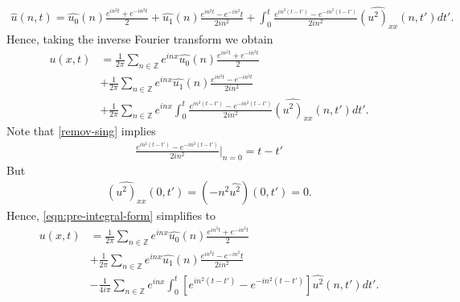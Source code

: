 \documentclass[12pt,reqno]{amsart}
\numberwithin{equation}{section}  %
\numberwithin{figure}{section}
\newcommand{\zz}{\mathbb{Z}}
\newcommand{\wh}{\widehat}
\theoremstyle{plain}
\theoremstyle{definition}
\theoremstyle{remark}
\begin{document}
%
%
\begin{equation*}
\begin{split}
\wh{u}(n, t) = \wh{u_{0}}(n) \frac{e^{in^{2}t} + e^{-in^{2}t}}{2} +
  \wh{u_{1}}(n)\frac{e^{in^{2}t} - e^{-in^{2}}t}{2 i n^{2}} +
  \int_{0}^{t}\frac{e^{in^{2}(t-t')}-e^{-in^{2}(t-t')}}{2in^{2}}
  \wh{(u^{2})_{xx}}(n, t') dt'.
\end{split}
\end{equation*}
%
Hence, taking the inverse Fourier transform we obtain
%
\begin{equation}
  \begin{split}
    u(x,t)
    & = \frac{1}{2\pi}\sum_{n \in \zz} e^{inx} \wh{u_{0}}(n) \frac{e^{in^{2}t} + e^{-in^{2}t}}{2} 
    \\
    & + \frac{1}{2 \pi}\sum_{n \in \zz} e^{inx}
    \wh{u_{1}}(n)\frac{e^{in^{2}t} - e^{-in^{2}t}}{2 i n^{2}} 
    \\
    & + \frac{1}{2 \pi}\sum_{n \in \zz} e^{inx}
    \int_{0}^{t}\frac{e^{in^{2}(t-t')}-e^{-in^{2}(t-t')}}{2 i n^{2}}
    \wh{(u^{2})_{xx}}(n, t') dt'.
  \end{split}
  \label{eqn:pre-integral-form}
\end{equation}
%
Note that \eqref{remov-sing} implies
%
%
\begin{equation*}
\begin{split}
  \frac{e^{in^{2}(t - t')} - e^{-in^{2}(t-t')}}{2 i n^{2}} \Big |_{n=0} = t-t'
\end{split}
\end{equation*}
%
%
But 
%
%
\begin{equation*}
\begin{split}
  \wh{(u^{2})_{xx}}(0, t') = (-n^{2} \wh{u^{2}})(0, t') = 0.
\end{split}
\end{equation*}
%
%
Hence, \eqref{eqn:pre-integral-form} simplifies to
%
\begin{equation}
  \begin{split}
    u(x,t)
    & = \frac{1}{2\pi}\sum_{n \in \zz} e^{inx} \wh{u_{0}}(n) \frac{e^{in^{2}t} + e^{-in^{2}t}}{2} 
    \\
    & + \frac{1}{2 \pi}\sum_{n \in \zz} e^{inx}
    \wh{u_{1}}(n)\frac{e^{in^{2}t} - e^{-in^{2}}t}{2 i n^{2}} 
    \\
    & - \frac{1}{4 i \pi}\sum_{n \in \zz} e^{inx}
    \int_{0}^{t}[e^{in^{2}(t-t')}-e^{-in^{2}(t-t')}]
    \wh{u^{2}}(n, t') dt'.
  \end{split}
  \label{eqn:integral-form}
\end{equation}
\end{document}
